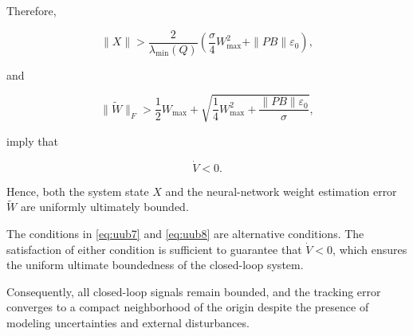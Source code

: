 Therefore,

\begin{equation}
	\|X\|
	>
	\frac{2}{\lambda_{\min}(Q)}
	\left(
	\frac{\sigma}{4}
	W_{\max}^{2}
	+
	\|PB\|
	\varepsilon_{0}
	\right),
	\label{eq:uub7}
\end{equation}

and

\begin{equation}
	\|\tilde{W}\|_{F}
	>
	\frac12
	W_{\max}
	+
	\sqrt{
		\frac14
		W_{\max}^{2}
		+
		\frac{\|PB\|
			\varepsilon_{0}}
		{\sigma}
	},
	\label{eq:uub8}
\end{equation}

imply that

\[
\dot V<0.
\]

Hence, both the system state $X$ and the neural-network weight estimation error $\tilde{W}$ are uniformly ultimately bounded.

\begin{remark}
	The conditions in \eqref{eq:uub7} and \eqref{eq:uub8} are alternative conditions. The satisfaction of either condition is sufficient to guarantee that $\dot V<0$, which ensures the uniform ultimate boundedness of the closed-loop system.
\end{remark}

Consequently, all closed-loop signals remain bounded, and the tracking error converges to a compact neighborhood of the origin despite the presence of modeling uncertainties and external disturbances.